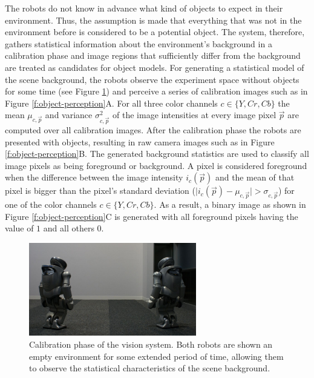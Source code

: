 The robots do not know in advance what kind of objects to expect in
their environment. Thus, the assumption is made that everything that
was not in the environment before is considered to be a potential
object. The system, therefore, gathers statistical information about 
the environment's background in a calibration phase 
and image regions that sufficiently differ from the background are 
treated as candidates for object models. 
For generating a statistical model of the scene
background, the robots observe the experiment space without objects
for some time (see Figure \ref{f:photo-calibration-phase}) and
perceive a series of calibration images such as in Figure
\ref{f:object-perception}A. For all three color channels $c \in
\{Y,Cr,Cb\}$ the mean $\mu_{c,\vec{p}}$ and variance
$\sigma_{c,\vec{p}}^2$ of the image intensities at every image pixel
$\vec{p}$ are computed over all calibration images. After the
calibration phase the robots are presented with objects, resulting in
raw camera images such as in Figure \ref{f:object-perception}B. The
generated background statistics are used to classify all image pixels
as being foreground or background. A pixel is considered foreground
when the difference between the image intensity $i_c(\vec{p})$ and the
mean of that pixel is bigger than the pixel's standard deviation
($\mid i_c(\vec{p}) - \mu_{c,\vec{p}}\mid > \sigma_{c,\vec{p}}$) for
one of the color channels $c \in \{Y,Cr,Cb\}$. As a result, a binary
image as shown in Figure \ref{f:object-perception}C is generated with
all foreground pixels having the value of $1$ and all others $0$.

\begin{figure}[t]
  \includegraphics[width=0.65\textwidth]{figures/vision-system-photo-calibration-phase}
  \caption{Calibration phase of the vision system. Both robots are
    shown an empty environment for some extended period of time,
    allowing them to observe the statistical characteristics of the
    scene background.}
  \label{f:photo-calibration-phase}
\end{figure}

